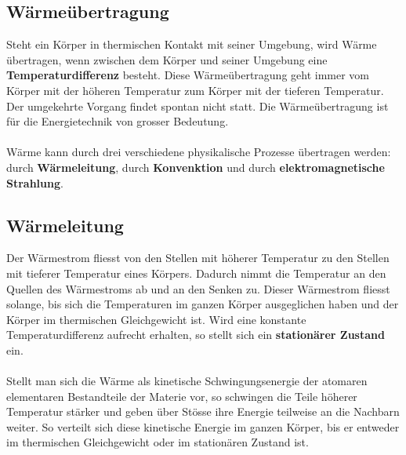 \subsection{Wärmeübertragung}
Steht ein Körper in thermischen Kontakt mit seiner Umgebung, wird Wärme übertragen, wenn zwischen dem Körper und seiner Umgebung eine \textbf{Temperaturdifferenz} besteht. Diese Wärmeübertragung geht immer vom Körper mit der höheren Temperatur zum Körper mit der tieferen Temperatur. Der umgekehrte Vorgang findet spontan nicht statt. Die Wärmeübertragung ist für die Energietechnik von grosser Bedeutung.
\\\\
Wärme kann durch drei verschiedene physikalische Prozesse übertragen werden: durch \textbf{Wärmeleitung}, durch \textbf{Konvenktion} und durch \textbf{elektromagnetische Strahlung}.
\subsection{Wärmeleitung}
Der Wärmestrom fliesst von den Stellen mit höherer Temperatur zu den Stellen mit tieferer Temperatur eines Körpers. Dadurch nimmt die Temperatur an den Quellen des Wärmestroms ab und an den Senken zu. Dieser Wärmestrom fliesst solange, bis sich die Temperaturen im ganzen Körper ausgeglichen haben und der Körper im thermischen Gleichgewicht ist. Wird eine konstante Temperaturdifferenz aufrecht erhalten, so stellt sich ein \textbf{stationärer Zustand} ein. 
\\\\
Stellt man sich die Wärme als kinetische Schwingungsenergie der atomaren elementaren Bestandteile der Materie vor, so schwingen die Teile höherer Temperatur stärker und geben über Stösse ihre Energie teilweise an die Nachbarn weiter. So verteilt sich diese kinetische Energie im ganzen Körper, bis er entweder im thermischen Gleichgewicht oder im stationären Zustand ist.
